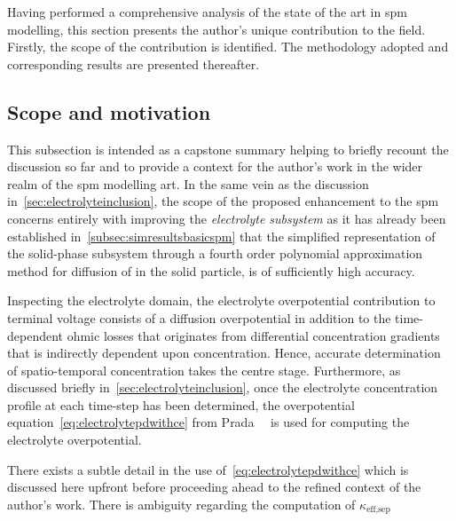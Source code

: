 
Having performed a  comprehensive analysis of the state of  the art in \gls{spm}
modelling, this section presents the  author's unique contribution to the field.
Firstly, the  scope of the  contribution is identified. The  methodology adopted
and corresponding results are presented thereafter.

\subsection{Scope and motivation}\label{subsec:scopenewelectrolyte}

This subsection is intended as a capstone summary helping to briefly recount the
discussion so far  and to provide a  context for the author's work  in the wider
realm  of the  \gls{spm}  modelling art.  In  the same  vein  as the  discussion
in~\cref{sec:electrolyteinclusion}, the scope of the proposed enhancement to the
\gls{spm} concerns  entirely with improving the  \emph{electrolyte subsystem} as
it  has already  been established  in~\cref{subsec:simresultsbasicspm} that  the
simplified representation  of the solid-phase  subsystem through a  fourth order
polynomial  approximation  method  for  diffusion  of    in  the  solid
particle, is of sufficiently high accuracy.

Inspecting the  electrolyte domain,  the electrolyte  overpotential contribution
to  terminal  voltage   consists  of  a  diffusion   overpotential  in  addition
to   the  time-dependent   ohmic  losses   that  originates   from  differential
concentration gradients that is  indirectly dependent upon concentration. Hence,
accurate  determination  of  spatio-temporal   concentration  takes  the  centre
stage.  Furthermore,  as discussed  briefly  in~\cref{sec:electrolyteinclusion},
once   the   electrolyte   concentration   profile   at   each   time-step   has
been   determined,   the  overpotential   equation~\cref{eq:electrolytepdwithce}
from  Prada~\etal~\cite{Prada2012}   is  used  for  computing   the  electrolyte
overpotential.

There  exists  a  subtle  detail  in  the  use  of~\cref{eq:electrolytepdwithce}
which  is  discussed  here  upfront  before  proceeding  ahead  to  the  refined
context of  the author's work. There  is ambiguity regarding the  computation of
$\kappa_\text{eff,sep}$


